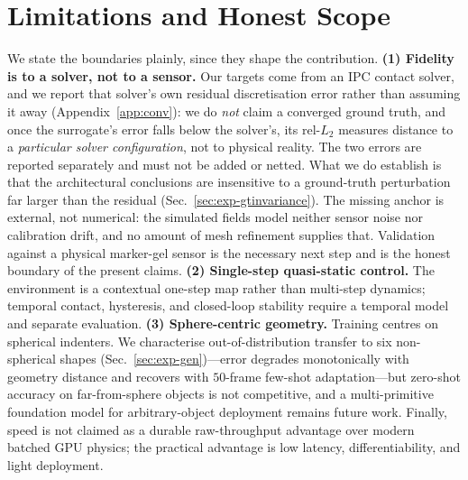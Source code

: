 \documentclass[conference]{IEEEtran}
\newcommand{\relL}{\mathrm{rel}\text{-}L_2}
\begin{document}
\section{Limitations and Honest Scope}\label{sec:limits}
We state the boundaries plainly, since they shape the contribution.
\textbf{(1) Fidelity is to a solver, not to a sensor.} Our targets come from an IPC
contact solver, and we report that solver's own residual discretisation error rather
than assuming it away (Appendix~\ref{app:conv}): we do \emph{not} claim a converged
ground truth, and once the surrogate's error falls below the solver's, its $\relL$
measures distance to a \emph{particular solver configuration}, not to physical
reality. The two errors are reported separately and must not be added or netted.
What we do establish is that the architectural conclusions are insensitive to a
ground-truth perturbation far larger than the residual (Sec.~\ref{sec:exp-gtinvariance}).
The missing anchor is external, not numerical: the simulated fields model neither
sensor noise nor calibration drift, and no amount of mesh refinement supplies that.
Validation against a physical marker-gel sensor is the necessary next step and is
the honest boundary of the present claims.
\textbf{(2) Single-step quasi-static control.} The environment is a contextual
one-step map rather than multi-step dynamics; temporal contact, hysteresis, and
closed-loop stability require a temporal model and separate evaluation.
\textbf{(3) Sphere-centric geometry.} Training centres on spherical indenters.
We characterise out-of-distribution transfer to six non-spherical shapes
(Sec.~\ref{sec:exp-gen})---error degrades monotonically with geometry distance and
recovers with $50$-frame few-shot adaptation---but zero-shot accuracy on
far-from-sphere objects is not competitive, and a multi-primitive foundation model
for arbitrary-object deployment remains future work. Finally, speed is not claimed as a durable raw-throughput advantage over
modern batched GPU physics; the practical advantage is low latency,
differentiability, and light deployment.
\end{document}
